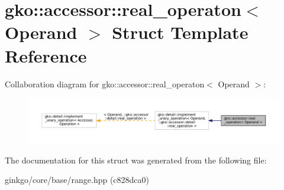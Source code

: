 \hypertarget{structgko_1_1accessor_1_1real__operaton}{}\section{gko\+:\+:accessor\+:\+:real\+\_\+operaton$<$ Operand $>$ Struct Template Reference}
\label{structgko_1_1accessor_1_1real__operaton}


Collaboration diagram for gko\+:\+:accessor\+:\+:real\+\_\+operaton$<$ Operand $>$\+:
\nopagebreak
\begin{figure}[H]
\begin{center}
\leavevmode
\includegraphics[width=350pt]{structgko_1_1accessor_1_1real__operaton__coll__graph}
\end{center}
\end{figure}


The documentation for this struct was generated from the following file\+:\begin{DoxyCompactItemize}
\item 
ginkgo/core/base/range.\+hpp (c828dca0)\end{DoxyCompactItemize}
